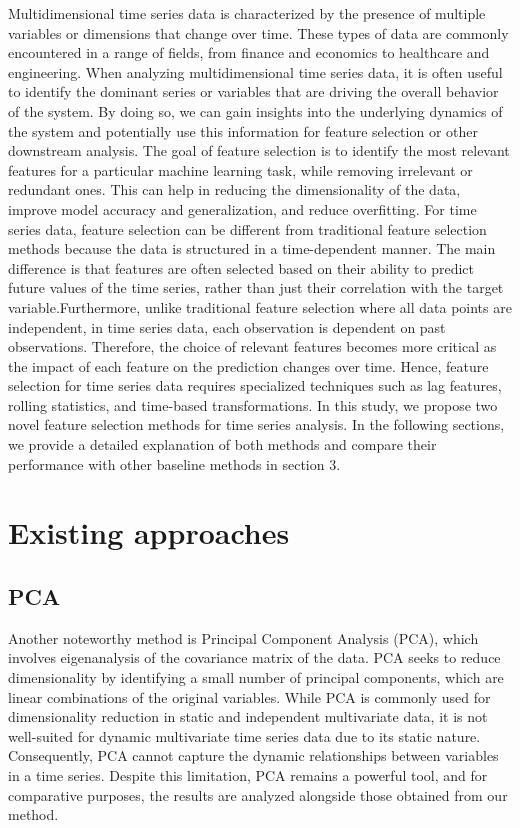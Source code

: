 \documentclass[twoside,11pt]{article}
\begin{document}
Multidimensional time series data is characterized by the presence of multiple variables
or dimensions that change over time. These types of data are commonly encountered
in a range of fields, from finance and economics to healthcare and engineering. When
analyzing multidimensional time series data, it is often useful to identify the dominant
series or variables that are driving the overall behavior of the system. By doing so, we can
gain insights into the underlying dynamics of the system and potentially use this information
for feature selection or other downstream analysis.
The goal of feature selection is to identify the most relevant features for a particular
machine learning task, while removing irrelevant or redundant ones. This can help in reducing the dimensionality of the data, improve model accuracy and generalization, and reduce
overfitting. For time series data, feature selection can be different from traditional feature
selection methods because the data is structured in a time-dependent manner. The main
difference is that features are often selected based on their ability to predict future values of the time series, rather than just their correlation with the target variable.Furthermore,
unlike traditional feature selection where all data points are independent, in time series
data, each observation is dependent on past observations. Therefore, the choice of relevant
features becomes more critical as the impact of each feature on the prediction changes over
time. Hence, feature selection for time series data requires specialized techniques such as
lag features, rolling statistics, and time-based transformations.
In this study, we propose two novel feature selection methods for time series analysis.
In the following sections, we provide a detailed explanation of both methods and compare
their performance with other baseline methods in section 3.
\section{Existing approaches}
\subsection{PCA}
Another noteworthy method is Principal Component Analysis (PCA), which involves eigenanalysis of the covariance matrix of the data. PCA seeks to reduce dimensionality by identifying a small number of principal components, which are linear combinations of the original variables. While PCA is commonly used for dimensionality reduction in static and independent multivariate data, it is not well-suited for dynamic multivariate time series data due to its static nature. Consequently, PCA cannot capture the dynamic relationships between variables in a time series. Despite this limitation, PCA remains a powerful tool, and for comparative purposes, the results are analyzed alongside those obtained from our method.
\end{document}
